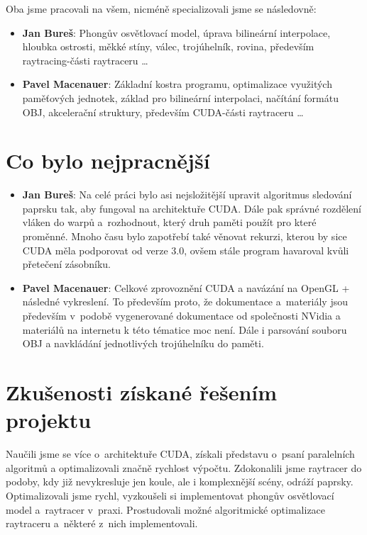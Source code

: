 \documentclass[12pt,a4paper,titlepage,final]{report}
\begin{document}
Oba jsme pracovali na všem, nicméně specializovali jsme se následovně:

\begin{itemize}
\item \textbf{Jan Bureš}: Phongův osvětlovací model, úprava bilineární interpolace, hloubka ostrosti, měkké stíny, válec, trojúhelník, rovina, především raytracing-části raytraceru \dots
\item \textbf{Pavel Macenauer}: Základní kostra programu, optimalizace využitých paměťových jednotek, základ pro bilineární interpolaci, načítání formátu OBJ, akcelerační struktury, především CUDA-části raytraceru \dots
\end{itemize}

\section{Co bylo nejpracnější}

\begin{itemize}
\item \textbf{Jan Bureš}: Na celé práci bylo asi nejsložitější upravit algoritmus sledování paprsku tak, aby fungoval na architektuře CUDA. Dále pak správné rozdělení vláken do warpů a~rozhodnout, který druh paměti použít pro které proměnné. Mnoho času bylo zapotřebí také věnovat rekurzi, kterou by sice CUDA měla podporovat od verze 3.0, ovšem stále program havaroval kvůli přetečení zásobníku.

\item \textbf{Pavel Macenauer}:  Celkové zprovoznění CUDA a navázání na OpenGL + následné vykreslení. To především proto, že dokumentace a~materiály jsou především v~podobě vygenerované dokumentace od společnosti NVidia a materiálů na internetu k této tématice moc není. Dále i parsování souboru OBJ a navkládání jednotlivých trojúhelníku do paměti.
\end{itemize}
\section{Zkušenosti získané řešením projektu}

Naučili jsme se více o~architektuře CUDA, získali představu o~psaní paralelních algoritmů a optimalizovali značně rychlost výpočtu. Zdokonalili jsme raytracer do podoby, kdy již nevykresluje jen koule, ale i komplexnější scény, odráží paprsky. Optimalizovali jsme rychl, vyzkoušeli si implementovat phongův osvětlovací model a~raytracer v~praxi. Prostudovali možné algoritmické optimalizace raytraceru a~některé z~nich implementovali.
\end{document}
